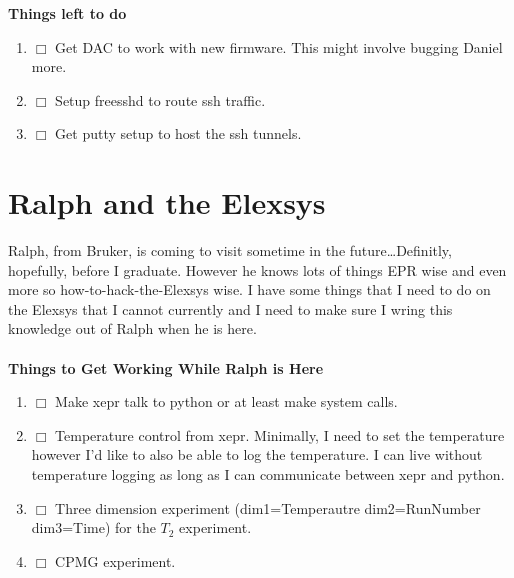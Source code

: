\documentclass[10pt]{book}
\begin{document}
{\bf Things left to do}
\begin{enumerate}
    \item $\Box$ Get DAC to work with new firmware. This might involve bugging Daniel more.
    \item $\Box$ Setup freesshd to route ssh traffic.
    \item $\Box$ Get putty setup to host the ssh tunnels.
\end{enumerate}


\chapter{Ralph and the Elexsys}
Ralph, from Bruker, is coming to visit sometime in the future\ldots Definitly, hopefully, before I graduate. However he knows lots of things EPR wise and even more so how-to-hack-the-Elexsys wise. I have some things that I need to do on the Elexsys that I cannot currently and I need to make sure I wring this knowledge out of Ralph when he is here.\\ \\

{\bf Things to Get Working While Ralph is Here}
\begin{enumerate}
    \item $\Box$ Make xepr talk to python or at least make system calls.
    \item $\Box$ Temperature control from xepr. Minimally, I need to set the temperature however I'd like to also be able to log the temperature. I can live without temperature logging as long as I can communicate between xepr and python.
    \item $\Box$ Three dimension experiment (dim1=Temperautre dim2=RunNumber dim3=Time) for the $T_2$ experiment.
    \item $\Box$ CPMG experiment.
\end{enumerate}
\end{document}
